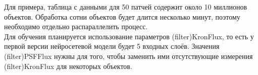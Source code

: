 Для примера, таблица с данными для 50 патчей содержит около 10 миллионов объектов. Обработка 
сотни объектов будет длится несколько минут, поэтому необходимо отдельно распараллелить процесс.\\

Для обучения планируется использование параметров (filter)KronFlux, то есть у первой версии 
нейросетевой модели будет 5 входных слоёв. Значения (filter)PSFFlux нужны для того, чтобы заменить 
ими отсутствующие измерения (filter)KronFlux для некоторых объектов.\\

